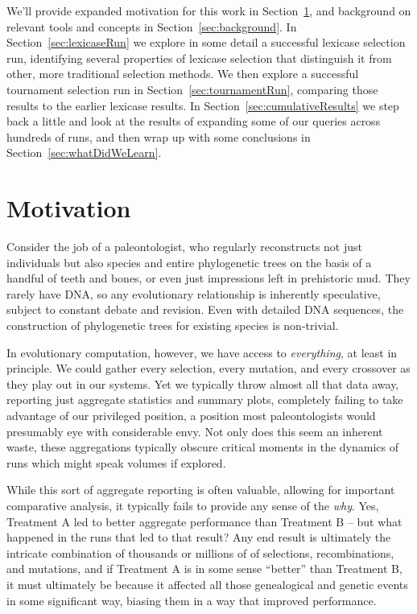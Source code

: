 We'll provide expanded motivation for this work in Section~\ref{sec:motivation}, and background on relevant tools
and concepts in Section~\ref{sec:background}. In Section~\ref{sec:lexicaseRun} we explore in some detail a successful
lexicase selection run, identifying several properties of lexicase selection that distinguish it from
other, more traditional selection methods. We then explore a successful tournament selection run in
Section~\ref{sec:tournamentRun}, comparing those results to the earlier lexicase results. 
In Section~\ref{sec:cumulativeResults} we step back a little and look at the results of expanding some of our queries
across hundreds of runs, and then wrap up with some conclusions in Section~\ref{sec:whatDidWeLearn}.

\section{Motivation}
\label{sec:motivation}

Consider the job of a paleontologist, who regularly reconstructs not just individuals but also
species and entire phylogenetic trees on the basis of a handful of teeth and bones, or even just
impressions left in prehistoric mud. They rarely have DNA, so any evolutionary relationship is
inherently speculative, subject to constant debate and revision. Even with detailed DNA sequences,
the construction of phylogenetic trees for existing species is non-trivial.

In evolutionary computation, however, we have access to \emph{everything}, at least in principle. 
We could gather every
selection, every mutation, and every crossover as they play out in our systems.
Yet we typically throw almost all that data away, reporting just aggregate statistics and summary
plots, completely failing to take advantage of our privileged position, a position most 
paleontologists would presumably eye with considerable envy. Not only does this seem an inherent
waste, these aggregations typically obscure critical moments in the dynamics of runs which might
speak volumes if explored.

While this sort of aggregate reporting is often valuable, allowing for important comparative
analysis, it typically fails to provide
any sense of the \emph{why}. Yes, Treatment A led to better aggregate performance than 
Treatment B -- but what happened in the runs that led to that result? Any end result
is ultimately the intricate combination of thousands or millions of of selections, recombinations,
and mutations, and if Treatment A is in some sense ``better'' than Treatment B, it must ultimately
be because it affected all those genealogical and genetic events in some significant way, biasing them
in a way that improved performance.

